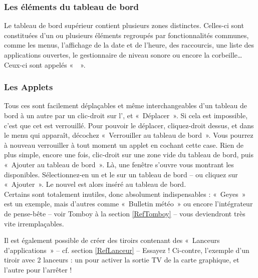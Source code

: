 \subsubsection{Les éléments du tableau de bord}
Le tableau de bord supérieur contient plusieurs zones distinctes. Celles-ci sont constituées d'un ou plusieurs éléments regroupés par fonctionnalités communes, comme les menus, l'affichage de la date et de l'heure, des raccourcis, une liste des applications ouvertes, le gestionnaire de niveau sonore ou encore la corbeille\ldots{} Ceux-ci sont appelés «~~».
\subsubsection{Les Applets}
\label{RefApplet}
Tous ces  sont facilement déplaçables et même interchangeables d'un tableau de bord à un autre par un clic-droit sur l', et «~Déplacer~». Si cela est impossible, c'est que cet  est verrouillé. Pour pouvoir le déplacer, cliquez-droit dessus, et dans le menu qui apparaît, décochez «~Verrouiller au tableau de bord~». Vous pourrez à nouveau verrouiller à tout moment un applet en cochant cette case.
Rien de plus simple, encore une fois, clic-droit sur une zone vide du tableau de bord, puis «~Ajouter au tableau de bord~». Là, une fenêtre s'ouvre vous montrant les  disponibles. Sélectionnez-en un et  le sur un tableau de bord -- ou cliquez sur «~Ajouter~». Le nouvel  est alors inséré au tableau de bord.\\
Certains sont totalement inutiles, donc absolument indispensables : «~Geyes~» est un exemple, mais d'autres comme «~Bulletin météo~» ou encore l'intégrateur de pense-bête -- voir Tomboy à la section \ref{RefTomboy} -- vous deviendront très vite irremplaçables.\par
{}
Il est également possible de créer des tiroirs contenant des «~Lanceurs d'applications~» -- cf. section \ref{RefLanceur} --  Essayez ! Ci-contre, l'exemple d'un tiroir avec 2 lanceurs : un pour activer la sortie TV de la carte graphique, et l'autre pour l'arrêter !\\\\\\

